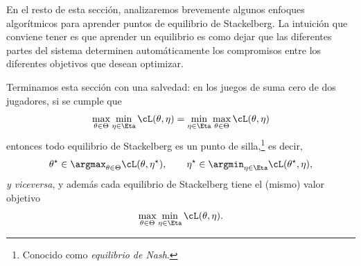 \documentclass[../../book-main_es.tex]{subfiles}
\begin{document}
En el resto de esta sección, analizaremos brevemente algunos enfoques algorítmicos
para aprender puntos de equilibrio de Stackelberg. La intuición que conviene tener
es que aprender un equilibrio es como dejar que las diferentes
partes del sistema determinen automáticamente los compromisos entre los
diferentes objetivos que desean optimizar.

Terminamos esta sección con una salvedad: en los juegos de suma cero de dos jugadores, si
se cumple que
\begin{equation}
    \max_{\theta \in \Theta}\min_{\eta \in \Eta}\cL(\theta, \eta) =
    \min_{\eta \in \Eta}\max_{\theta \in \Theta}\cL(\theta, \eta)
\end{equation}
entonces todo equilibrio de Stackelberg es un punto de 
silla,\footnote{Conocido como \textit{equilibrio de Nash}.} es decir,
\begin{equation}
    \theta^{\star} \in \argmax_{\theta \in \Theta}\cL(\theta,
    \eta^{\star}), \qquad \eta^{\star} \in \argmin_{\eta \in
    \Eta}\cL(\theta^{\star}, \eta),
\end{equation}
\textit{y viceversa}, y además cada equilibrio de Stackelberg
tiene el (mismo) valor objetivo \[\max_{\theta \in \Theta}\min_{\eta
\in \Eta}\cL(\theta, \eta).\]
\end{document}
